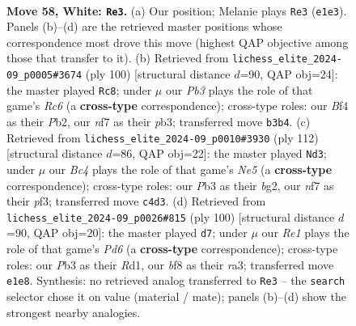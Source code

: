 \documentclass[11pt]{article}
\begin{document}
\begin{figure}[p]\centering
\begin{subfigure}{0.46\textwidth}\centering
\resizebox{\linewidth}{!}{%
\newchessgame
\chessboard[
  setfen={5b1r/p4nkp/P7/2r5/2B2B2/1Pp3KP/R1P3P1/4R3 w - - 23 58},
  showmover=false,
  pgfstyle=straightmove, color=movearrow, markmove={e1-e3}
]}
\caption{}
\end{subfigure}\hfill
\begin{subfigure}{0.46\textwidth}\centering
\resizebox{\linewidth}{!}{%
\newchessgame
\chessboard[
  setfen={3b4/p3k3/P1R5/1B3p2/1rP1p3/1p2P2p/1P2KP1P/8 w - - 3 51},
  showmover=false,
  pgfstyle=straightmove, color=movearrow, markmove={c6-c8}
]}
\caption{}
\end{subfigure}
\\[4pt]
\begin{subfigure}{0.46\textwidth}\centering
\resizebox{\linewidth}{!}{%
\newchessgame
\chessboard[
  setfen={2r5/p1P5/3B4/1RP1N1rk/1K2n3/1P3p1p/P5bP/3R4 w - - 2 57},
  showmover=false,
  pgfstyle=straightmove, color=movearrow, markmove={e5-d3}
]}
\caption{}
\end{subfigure}\hfill
\begin{subfigure}{0.46\textwidth}\centering
\resizebox{\linewidth}{!}{%
\newchessgame
\chessboard[
  setfen={8/7k/3P2p1/2pB1p1p/1bP2P1P/rr2BKP1/8/3R4 w - - 1 51},
  showmover=false,
  pgfstyle=straightmove, color=movearrow, markmove={d6-d7}
]}
\caption{}
\end{subfigure}
\caption{\textbf{Move 58, White: \texttt{Re3}.} (a) Our position; Melanie plays \texttt{Re3} (\texttt{e1e3}). Panels (b)--(d) are the retrieved master positions whose correspondence most drove this move (highest QAP objective among those that transfer to it). (b) Retrieved from \texttt{lichess\_elite\_2024-09\_p0005\#3674} (ply 100) [structural distance $d$=90, QAP obj=24]: the master played \texttt{Rc8}; under $\mu$ our \emph{Pb3} plays the role of that game's \emph{Rc6} (a \textbf{cross-type} correspondence); cross-type roles: our \emph{B}f4 as their \emph{P}b2, our \emph{n}f7 as their \emph{p}b3; transferred move \texttt{b3b4}. (c) Retrieved from \texttt{lichess\_elite\_2024-09\_p0010\#3930} (ply 112) [structural distance $d$=86, QAP obj=22]: the master played \texttt{Nd3}; under $\mu$ our \emph{Bc4} plays the role of that game's \emph{Ne5} (a \textbf{cross-type} correspondence); cross-type roles: our \emph{P}b3 as their \emph{b}g2, our \emph{n}f7 as their \emph{p}f3; transferred move \texttt{c4d3}. (d) Retrieved from \texttt{lichess\_elite\_2024-09\_p0026\#815} (ply 100) [structural distance $d$=90, QAP obj=20]: the master played \texttt{d7}; under $\mu$ our \emph{Re1} plays the role of that game's \emph{Pd6} (a \textbf{cross-type} correspondence); cross-type roles: our \emph{P}b3 as their \emph{R}d1, our \emph{b}f8 as their \emph{r}a3; transferred move \texttt{e1e8}. Synthesis: no retrieved analog transferred to \texttt{Re3} -- the \texttt{search} selector chose it on value (material / mate); panels (b)--(d) show the strongest nearby analogies.}
\label{fig:thought-m114}
\end{figure}
\end{document}
